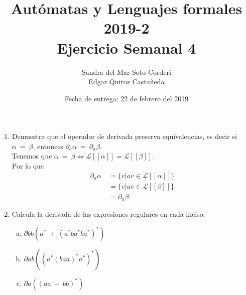 \documentclass{article}
\begin{document}
    
    \title{Autómatas y Lenguajes formales 2019-2\\
    \large Ejercicio Semanal 4}

    \date{Fecha de entrega: 22 de febrero del 2019}

    \author{Sandra del Mar Soto Corderi\\
    Edgar Quiroz Castañeda}

    \maketitle


    \begin{enumerate}
        \item {
        Demuestra que el operador de derivada preserva equivalencias, es decir si
        $\alpha \ = \ \beta$, entonces $\partial_{a} \alpha \ = \ \partial_{a} \beta$.\\
        Tenemos que $\alpha \ = \ \beta \iff 
        \mathcal{L}[\![\alpha]\!] = \mathcal{L}[\![\beta]\!]$. \\
        Por lo que 
        \begin{align*}
            \partial_{a} \alpha \ &= \{v | av \in \mathcal{L}[\![\alpha]\!]\} \\
                                  &= \{v | av \in \mathcal{L}[\![\beta]\!]\} \\
                                  &= \partial_{a} \beta
        \end{align*}

            
        }
        
        \item{
        Calcula la derivada de las expresiones regulares en cada inciso.\\
		\begin{enumerate}[a)]
		
		\item{
		$\partial{bb} (a^* \ + \  (a^*ba^*ba^*)^*)$\\
		
		
		}
		
		\item{
		$\partial{ab} ((a^*(baa)^*a^*)^*)$\\
		
		
		}
		
		\item{
		$\partial{a} ((aa \  + \  bb)^*)$\\
		
		
		}		
		
		\end{enumerate}		        
        
        
        }
    \end{enumerate}
\end{document}
